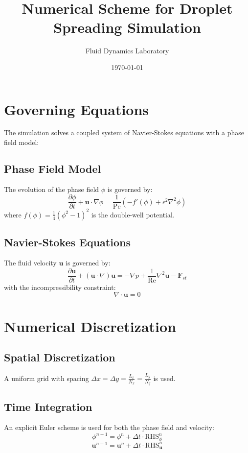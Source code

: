 \documentclass{article}
\title{Numerical Scheme for Droplet Spreading Simulation}
\author{Fluid Dynamics Laboratory}
\date{\today}
\begin{document}
\maketitle

\section{Governing Equations}
The simulation solves a coupled system of Navier-Stokes equations with a phase field model:

\subsection{Phase Field Model}
The evolution of the phase field $\phi$ is governed by:
\begin{equation}
\frac{\partial \phi}{\partial t} + \mathbf{u} \cdot \nabla \phi = \frac{1}{\textrm{Pe}} \left( -f'(\phi) + \epsilon^2 \nabla^2 \phi \right)
\end{equation}
where $f(\phi) = \frac{1}{4}(\phi^2-1)^2$ is the double-well potential.

\subsection{Navier-Stokes Equations}
The fluid velocity $\mathbf{u}$ is governed by:
\begin{equation}
\frac{\partial \mathbf{u}}{\partial t} + (\mathbf{u} \cdot \nabla) \mathbf{u} = -\nabla p + \frac{1}{\textrm{Re}} \nabla^2 \mathbf{u} - \mathbf{F}_{st}
\end{equation}
with the incompressibility constraint:
\begin{equation}
\nabla \cdot \mathbf{u} = 0
\end{equation}

\section{Numerical Discretization}

\subsection{Spatial Discretization}
A uniform grid with spacing $\Delta x = \Delta y = \frac{L_x}{N_x} = \frac{L_y}{N_y}$ is used.

\subsection{Time Integration}
An explicit Euler scheme is used for both the phase field and velocity:
\begin{equation}
\phi^{n+1} = \phi^n + \Delta t \cdot \textrm{RHS}_\phi^n
\end{equation}
\begin{equation}
\mathbf{u}^{n+1} = \mathbf{u}^n + \Delta t \cdot \textrm{RHS}_\mathbf{u}^n
\end{equation}
\end{document}
